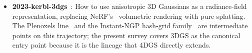 \bigskip
\begin{itemize}
\item \textbf{2023-kerbl-3dgs}~\cite{kerbl20233dgs}: How to use
      anisotropic 3D Gaussians as a radiance-field representation,
      replacing NeRF's~\cite{mildenhall2020nerf} volumetric rendering with pure splatting.
The Plenoxels line~\cite{fridovich2022plenoxels} and the
Instant-NGP hash-grid family~\cite{muller2022instantngp} are
intermediate points on this trajectory; the present survey
covers 3DGS as the canonical entry point because it is the
lineage that 4DGS directly extends.
\end{itemize}
